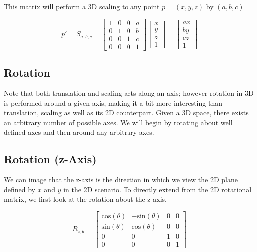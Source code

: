 \documentclass[12pt,letterpaper]{article}
\begin{document}
\newpage

This matrix will perform a 3D scaling to any point $p = (x, y, z)$ by $(a, b, c)$

\begin{equation}
    p' = S_{a, b, c} = \begin{bmatrix}
        1 & 0 & 0 & a \\
        0 & 1 & 0 & b \\
        0 & 0 & 1 & c \\
        0 & 0 & 0 & 1
    \end{bmatrix}
    \begin{bmatrix}
        x \\
        y \\
        z \\
        1
    \end{bmatrix}
    = \begin{bmatrix}
        ax \\
        by \\
        cz \\
        1
    \end{bmatrix}
\end{equation}

\subsection{Rotation}
Note that both translation and scaling acts along an axis; however rotation in 3D is performed around a given axis, making it a bit more interesting than translation, scaling as well as its 2D counterpart. Given a 3D space, there exists an arbitrary number of possible axes.  We will begin by rotating about well defined axes and then around any arbitrary axes.

\subsection{Rotation (z-Axis)}
We can image that the z-axis is the direction in which we view the 2D plane defined by $x$ and $y$ in the 2D scenario. To directly extend from the 2D rotational matrix, we first look at the rotation about the z-axis.

\begin{equation}
    R_{z, \theta} = \begin{bmatrix}
        \text{cos}(\theta) & -\text{sin}(\theta) & 0 & 0 \\
        \text{sin}(\theta) &  \text{cos}(\theta) & 0 & 0 \\
        0 & 0 & 1 & 0 \\
        0 & 0 & 0 & 1
    \end{bmatrix}
\end{equation}
\end{document}

